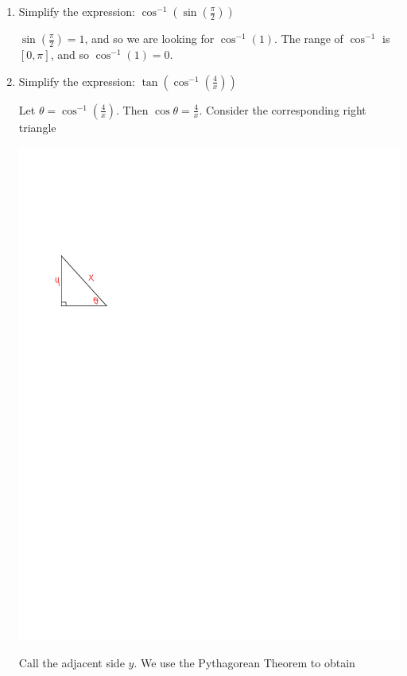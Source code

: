 \documentclass[nooutcomes]{ximera}
\begin{document}
			
			
\begin{problem}
	
			\begin{enumerate}
			
			\item  Simplify the expression:  $\cos^{-1} \left( \sin \left( \frac{\pi }{2} \right) \right) $ 
			
			 \begin{freeResponse}			 
			 $ \sin \left( \frac{\pi}{2} \right) = 1$, and so we are looking for $\cos^{-1}(1)$.  The range of $\cos^{-1}$ is $[0, \pi]$, and so $\cos^{-1} (1) = 0$.  
			 \end{freeResponse}
			
			\item  Simplify the expression:  $ \tan \left( \cos^{-1} \left( \frac{4}{x} \right) \right) $ 
			
			 \begin{freeResponse}			 
			 Let $\theta = \cos^{-1} \left( \frac{4}{x} \right) $.  Then $\cos \theta = \frac{4}{x}$.  Consider the corresponding right triangle
			 
			 \begin{image}
			 \includegraphics[trim=60 525 300 170]{Figure5.pdf}
			 \end{image}
			 Call the adjacent side $y$.  We use the Pythagorean Theorem to obtain
			

\end{freeResponse}
\end{enumerate}
\end{problem}
\end{document}

